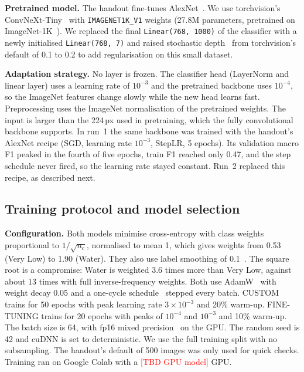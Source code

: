 \documentclass[10pt]{article}
\newcommand{\TBD}[1]{\textcolor{red}{[TBD #1]}}
\begin{document}
\textbf{Pretrained model.} The handout fine-tunes AlexNet~\cite{krizhevsky2012alexnet}. We use torchvision's~\cite{torchvision2016} ConvNeXt-Tiny~\cite{liu2022convnext} with \texttt{IMAGENET1K\_V1} weights (27.8M parameters, pretrained on ImageNet-1K~\cite{deng2009imagenet}). We replaced the final \texttt{Linear(768, 1000)} of the classifier with a newly initialised \texttt{Linear(768, 7)} and raised stochastic depth~\cite{huang2016stochasticdepth} from torchvision's default of 0.1 to 0.2 to add regularisation on this small dataset.

\textbf{Adaptation strategy.} No layer is frozen. The classifier head (LayerNorm and linear layer) uses a learning rate of $10^{-3}$ and the pretrained backbone uses $10^{-4}$, so the ImageNet features change slowly while the new head learns fast. Preprocessing uses the ImageNet normalisation of the pretrained weights. The input is larger than the 224\,px used in pretraining, which the fully convolutional backbone supports. In run~1 the same backbone was trained with the handout's AlexNet recipe (SGD, learning rate $10^{-3}$, StepLR, 5 epochs). Its validation macro F1 peaked in the fourth of five epochs, train F1 reached only 0.47, and the step schedule never fired, so the learning rate stayed constant. Run~2 replaced this recipe, as described next.

\subsection{Training protocol and model selection}

\textbf{Configuration.} Both models minimise cross-entropy with class weights proportional to $1/\sqrt{n_c}$, normalised to mean 1, which gives weights from 0.53 (Very Low) to 1.90 (Water). They also use label smoothing of 0.1~\cite{szegedy2016labelsmoothing}. The square root is a compromise: Water is weighted 3.6 times more than Very Low, against about 13 times with full inverse-frequency weights. Both use AdamW~\cite{loshchilov2019adamw} with weight decay 0.05 and a one-cycle schedule~\cite{smith2019superconvergence} stepped every batch. CUSTOM trains for 50 epochs with peak learning rate $3\times10^{-3}$ and 20\% warm-up. FINE-TUNING trains for 20 epochs with peaks of $10^{-4}$ and $10^{-3}$ and 10\% warm-up. The batch size is 64, with fp16 mixed precision~\cite{micikevicius2018amp} on the GPU. The random seed is 42 and cuDNN is set to deterministic. We use the full training split with no subsampling. The handout's default of 500 images was only used for quick checks. Training ran on Google Colab with a \TBD{GPU model} GPU.
\end{document}

